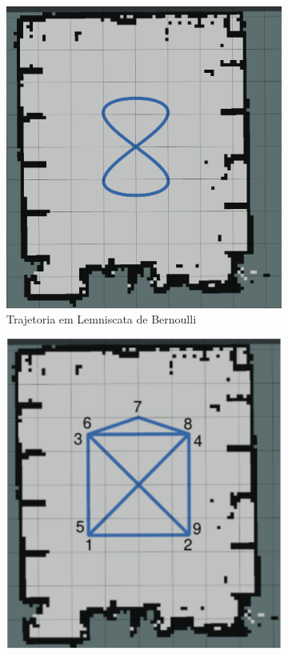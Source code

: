 \begin{figure}[htb]
    \centering
    \caption{Trajetórias Desejadas dos Experimentos}
    \begin{subfigure}[b]{0.4\textwidth}
        \includegraphics[width=\textwidth]{img/Trajetoria_Lemniscata.png}
        \caption{Trajetoria em Lemniscata de Bernoulli}
    \end{subfigure}
    \hspace{0.1\textwidth}
    \begin{subfigure}[b]{0.4\textwidth}
        \includegraphics[width=\textwidth]{img/Trajetoria_Casa_num.pdf}

\end{subfigure}
\end{figure}
